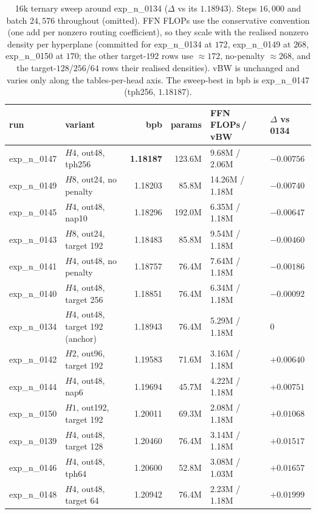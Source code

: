 \documentclass[11pt]{article}
\begin{document}
\begin{table}[ht]\centering
\begin{tabular}{llrrll}
\toprule
run & variant & bpb & params & FFN FLOPs\,/\,vBW & $\Delta$ vs 0134 \\
\midrule
exp\_n\_0147 & $H4$, out48, tph256 & \textbf{1.18187} & 123.6M & 9.68M / 2.06M & $-0.00756$ \\
exp\_n\_0149 & $H8$, out24, no penalty & 1.18203 & 85.8M & 14.26M / 1.18M & $-0.00740$ \\
exp\_n\_0145 & $H4$, out48, nap10 & 1.18296 & 192.0M & 6.35M / 1.18M & $-0.00647$ \\
exp\_n\_0143 & $H8$, out24, target 192 & 1.18483 & 85.8M & 9.54M / 1.18M & $-0.00460$ \\
exp\_n\_0141 & $H4$, out48, no penalty & 1.18757 & 76.4M & 7.64M / 1.18M & $-0.00186$ \\
exp\_n\_0140 & $H4$, out48, target 256 & 1.18851 & 76.4M & 6.34M / 1.18M & $-0.00092$ \\
exp\_n\_0134 & $H4$, out48, target 192 (anchor) & 1.18943 & 76.4M & 5.29M / 1.18M & $0$ \\
exp\_n\_0142 & $H2$, out96, target 192 & 1.19583 & 71.6M & 3.16M / 1.18M & $+0.00640$ \\
exp\_n\_0144 & $H4$, out48, nap6 & 1.19694 & 45.7M & 4.22M / 1.18M & $+0.00751$ \\
exp\_n\_0150 & $H1$, out192, target 192 & 1.20011 & 69.3M & 2.08M / 1.18M & $+0.01068$ \\
exp\_n\_0139 & $H4$, out48, target 128 & 1.20460 & 76.4M & 3.14M / 1.18M & $+0.01517$ \\
exp\_n\_0146 & $H4$, out48, tph64 & 1.20600 & 52.8M & 3.08M / 1.03M & $+0.01657$ \\
exp\_n\_0148 & $H4$, out48, target 64 & 1.20942 & 76.4M & 2.23M / 1.18M & $+0.01999$ \\
\bottomrule
\end{tabular}
\caption{16k ternary sweep around exp\_n\_0134 ($\Delta$ vs its $1.18943$). Steps $16{,}000$ and
batch $24{,}576$ throughout (omitted). FFN FLOPs use the conservative convention (one add per
nonzero routing coefficient), so they scale with the realised nonzero density per hyperplane
(committed for exp\_n\_0134 at $172$, exp\_n\_0149 at $268$, exp\_n\_0150 at $170$; the other
target-$192$ rows use $\approx172$, no-penalty $\approx268$, and the target-$128$/$256$/$64$ rows
their realised densities). vBW is unchanged and varies only along the tables-per-head axis. The
sweep-best in bpb is exp\_n\_0147 (tph256, $1.18187$).}
\label{tab:sweep}
\end{table}
\end{document}
